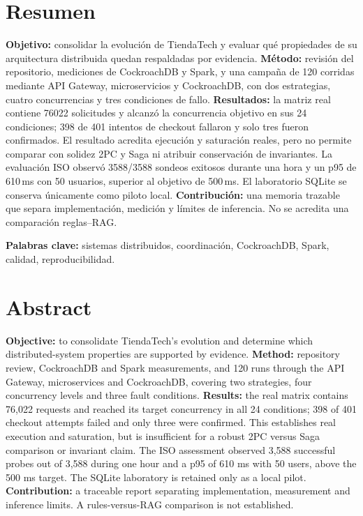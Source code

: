 \documentclass[12pt,a4paper]{article}
\begin{document}
\section*{Resumen}
\textbf{Objetivo:} consolidar la evolución de TiendaTech y evaluar qué propiedades de su arquitectura distribuida quedan respaldadas por evidencia. \textbf{Método:} revisión del repositorio, mediciones de CockroachDB y Spark, y una campaña de 120 corridas mediante API Gateway, microservicios y CockroachDB, con dos estrategias, cuatro concurrencias y tres condiciones de fallo. \textbf{Resultados:} la matriz real contiene 76022 solicitudes y alcanzó la concurrencia objetivo en sus 24 condiciones; 398 de 401 intentos de checkout fallaron y solo tres fueron confirmados. El resultado acredita ejecución y saturación reales, pero no permite comparar con solidez 2PC y Saga ni atribuir conservación de invariantes. La evaluación ISO observó 3588/3588 sondeos exitosos durante una hora y un p95 de 610\,ms con 50 usuarios, superior al objetivo de 500\,ms. El laboratorio SQLite se conserva únicamente como piloto local. \textbf{Contribución:} una memoria trazable que separa implementación, medición y límites de inferencia. No se acredita una comparación reglas--RAG.

\textbf{Palabras clave:} sistemas distribuidos, coordinación, CockroachDB, Spark, calidad, reproducibilidad.
\clearpage
\section*{Abstract}
\textbf{Objective:} to consolidate TiendaTech's evolution and determine which distributed-system properties are supported by evidence. \textbf{Method:} repository review, CockroachDB and Spark measurements, and 120 runs through the API Gateway, microservices and CockroachDB, covering two strategies, four concurrency levels and three fault conditions. \textbf{Results:} the real matrix contains 76,022 requests and reached its target concurrency in all 24 conditions; 398 of 401 checkout attempts failed and only three were confirmed. This establishes real execution and saturation, but is insufficient for a robust 2PC versus Saga comparison or invariant claim. The ISO assessment observed 3,588 successful probes out of 3,588 during one hour and a p95 of 610 ms with 50 users, above the 500 ms target. The SQLite laboratory is retained only as a local pilot. \textbf{Contribution:} a traceable report separating implementation, measurement and inference limits. A rules-versus-RAG comparison is not established.
\end{document}
